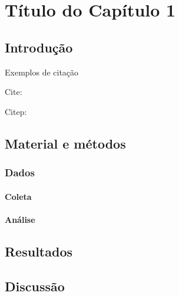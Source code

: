%
%

\chapter{Título do Capítulo 1}

\section{Introdução}

Exemplos de citação

Cite: \cite{levin_problem_1992}

Citep: \citep{levin_problem_1992}

\section{Material e métodos}

\subsection{Dados}

\subsubsection{Coleta}

\subsubsection{Análise}

\section{Resultados}

\section{Discussão}

%
%

%

